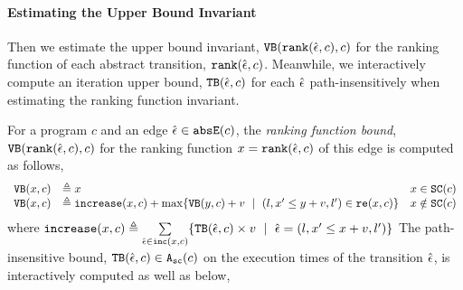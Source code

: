  \paragraph{Estimating the Upper Bound Invariant}
Then we estimate the upper bound invariant, ${\mathtt{VB}}(\mathtt{rank}(\hat{\mathtt{\epsilon}{}}, c), c)$ for the ranking function of each abstract transition, $\mathtt{rank}(\hat{\mathtt{\epsilon}{}}, c)$. Meanwhile, we interactively compute an iteration upper bound, ${\mathtt{TB}}(\hat{\mathtt{\epsilon}{}}, c)$ for each $\hat{\mathtt{\epsilon}{}}$ path-insensitively when estimating the ranking function invariant.
\begin{defn}
 \label{def:ranking_bound}
For a program $c$ and an edge $\hat{\mathtt{\epsilon}{}} \in \mathtt{abs}{\mathtt{E}}(c)$,
the \emph{ranking function bound}, 
${\mathtt{VB}}(\mathtt{rank}(\hat{\mathtt{\epsilon}{}}, c), c)$ for the ranking function $x = \mathtt{rank}(\hat{\mathtt{\epsilon}{}}, c)$
of this edge
is computed as follows,
{\small
 \[ 
\begin{array}{lll}
 \varinvar(x, c) & \triangleq x & x \in \scvar(c) \\
 \varinvar(x, c) & \triangleq \incrs(x, c) + \max\left\{\varinvar(y, c) + v ~\mid~ (l, x' \leq y + v, l') \in \reset(x, c) \right\} & x \notin \scvar(c)
\end{array}
\]
}
%
where $\mathtt{increase}(x, c) \triangleq \sum\limits_{\hat{\mathtt{\epsilon}{}} \in \mathtt{inc}(x, c)}\{{\mathtt{TB}}(\hat{\mathtt{\epsilon}{}}, c) \times v ~\mid~ \hat{\mathtt{\epsilon}{}} = (l, x' \leq x + v, l')\}$
The path-insensitive bound, ${\mathtt{TB}}(\hat{\mathtt{\epsilon}{}}, c) \in {\ensuremath{\mathtt{A_{sc}}}}(c)$ on the execution times of the transition $\hat{\mathtt{\epsilon}{}}$, is interactively computed as well as below,
{\small
}
\end{defn}
